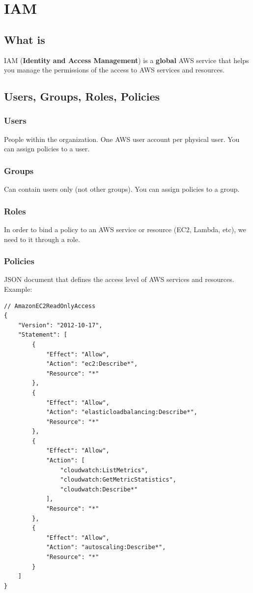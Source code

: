 \section{IAM}

\subsection{What is}
IAM (\textbf{Identity and Access Management}) is a \textbf{global} AWS service that helps you manage 
the permissions of the access to AWS services and resources.

\subsection{Users, Groups, Roles, Policies}

\subsubsection{Users}
People within the organization. One AWS user account per physical user. You can assign policies to a user.

\subsubsection{Groups}
Can contain users only (not other groups). You can assign policies to a group.

\subsubsection{Roles}
In order to bind a policy to an AWS service or resource (EC2, Lambda, etc), we need to it through a role.

\subsubsection{Policies}
JSON document that defines the access level of AWS services and resources. Example:


\begin{lstlisting}[basicstyle=\small]
// AmazonEC2ReadOnlyAccess
{
    "Version": "2012-10-17",
    "Statement": [
        {
            "Effect": "Allow",
            "Action": "ec2:Describe*",
            "Resource": "*"
        },
        {
            "Effect": "Allow",
            "Action": "elasticloadbalancing:Describe*",
            "Resource": "*"
        },
        {
            "Effect": "Allow",
            "Action": [
                "cloudwatch:ListMetrics",
                "cloudwatch:GetMetricStatistics",
                "cloudwatch:Describe*"
            ],
            "Resource": "*"
        },
        {
            "Effect": "Allow",
            "Action": "autoscaling:Describe*",
            "Resource": "*"
        }
    ]
}
\end{lstlisting}

